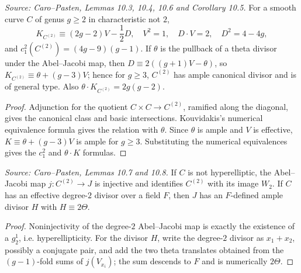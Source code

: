 \begin{lemma}
  \label{lem:cp_symmetric_square_intersections}
  \textit{Source: Caro--Pasten, Lemmas 10.3, 10.4, 10.6 and Corollary 10.5.}
  For a smooth curve \(C\) of genus \(g\ge2\) in characteristic not \(2\),
  \[
    K_{C^{(2)}}\equiv(2g-2)V-\frac12D,\quad
    V^2=1,\quad D\cdot V=2,\quad D^2=4-4g,
  \]
  and \(c_1^2(C^{(2)})=(4g-9)(g-1)\).  If \(\theta\) is the pullback of a
  theta divisor under the Abel--Jacobi map, then
  \(D\equiv2((g+1)V-\theta)\), so
  \(K_{C^{(2)}}\equiv\theta+(g-3)V\); hence for \(g\ge3\),
  \(C^{(2)}\) has ample canonical divisor and is of general type.  Also
  \(\theta\cdot K_{C^{(2)}}=2g(g-2)\).
\end{lemma}
\begin{proof}
  Adjunction for the quotient \(C\times C\to C^{(2)}\), ramified along the
  diagonal, gives the canonical class and basic intersections.  Kouvidakis's
  numerical equivalence formula gives the relation with \(\theta\).  Since
  \(\theta\) is ample and \(V\) is effective, \(K\equiv\theta+(g-3)V\) is ample
  for \(g\ge3\).  Substituting the numerical equivalences gives the
  \(c_1^2\) and \(\theta\cdot K\) formulas.
\end{proof}

\begin{lemma}
  \label{lem:cp_symmetric_square_jacobian_embedding}
  \textit{Source: Caro--Pasten, Lemmas 10.7 and 10.8.}
  If \(C\) is not hyperelliptic, the Abel--Jacobi map
  \(j:C^{(2)}\to J\) is injective and identifies \(C^{(2)}\) with its image
  \(W_2\).  If \(C\) has an effective degree-\(2\) divisor over a field \(F\),
  then \(J\) has an \(F\)-defined ample divisor \(H\) with
  \(H\equiv2\Theta\).
\end{lemma}
\begin{proof}
  Noninjectivity of the degree-\(2\) Abel--Jacobi map is exactly the existence
  of a \(g^1_2\), i.e. hyperellipticity.  For the divisor \(H\), write the
  degree-\(2\) divisor as \(x_1+x_2\), possibly a conjugate pair, and add the
  two theta translates obtained from the \((g-1)\)-fold sums of
  \(j(V_{x_i})\); the sum descends to \(F\) and is numerically \(2\Theta\).
\end{proof}

